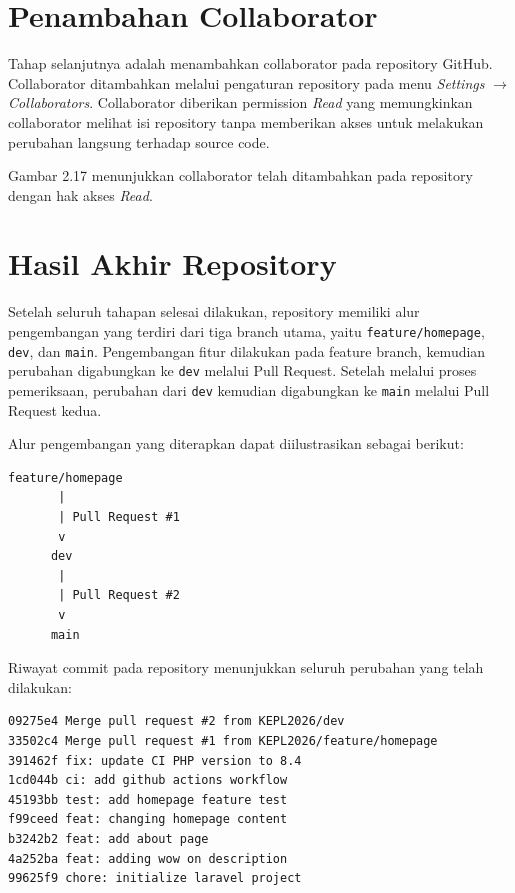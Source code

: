 \documentclass[a4paper,oneside,11pt]{book}
\begin{document}
\section{Penambahan Collaborator}

Tahap selanjutnya adalah menambahkan collaborator pada repository GitHub. Collaborator ditambahkan melalui pengaturan repository pada menu \textit{Settings} $\rightarrow$ \textit{Collaborators}. Collaborator diberikan permission \textit{Read} yang memungkinkan collaborator melihat isi repository tanpa memberikan akses untuk melakukan perubahan langsung terhadap source code.


Gambar 2.17 menunjukkan collaborator telah ditambahkan pada repository dengan hak akses \textit{Read}.

\section{Hasil Akhir Repository}

Setelah seluruh tahapan selesai dilakukan, repository memiliki alur pengembangan yang terdiri dari tiga branch utama, yaitu \texttt{feature/homepage}, \texttt{dev}, dan \texttt{main}. Pengembangan fitur dilakukan pada feature branch, kemudian perubahan digabungkan ke \texttt{dev} melalui Pull Request. Setelah melalui proses pemeriksaan, perubahan dari \texttt{dev} kemudian digabungkan ke \texttt{main} melalui Pull Request kedua.

Alur pengembangan yang diterapkan dapat diilustrasikan sebagai berikut:

\begin{lstlisting}
feature/homepage
       |
       | Pull Request #1
       v
      dev
       |
       | Pull Request #2
       v
      main
\end{lstlisting}

Riwayat commit pada repository menunjukkan seluruh perubahan yang telah dilakukan:

\begin{lstlisting}
09275e4 Merge pull request #2 from KEPL2026/dev
33502c4 Merge pull request #1 from KEPL2026/feature/homepage
391462f fix: update CI PHP version to 8.4
1cd044b ci: add github actions workflow
45193bb test: add homepage feature test
f99ceed feat: changing homepage content
b3242b2 feat: add about page
4a252ba feat: adding wow on description
99625f9 chore: initialize laravel project
\end{lstlisting}
\end{document}
